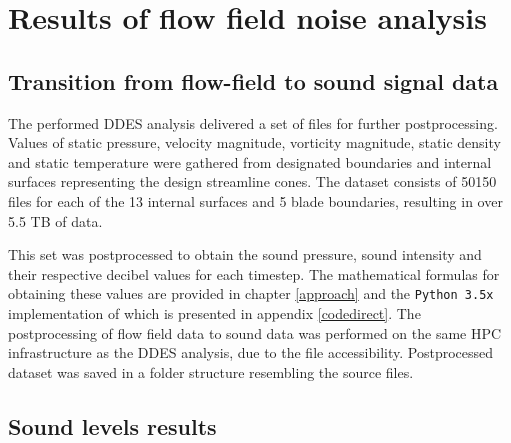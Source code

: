 
\chapter{Results of flow field noise analysis} %

\label{results} %



\section{Transition from flow-field to sound signal data}

The performed DDES analysis delivered a set of files for further postprocessing. Values of static pressure, velocity magnitude, vorticity magnitude, static density and static temperature were gathered from designated boundaries and internal surfaces representing the design streamline cones. The dataset consists of 50150 files for each of the 13 internal surfaces and 5 blade boundaries, resulting in over 5.5 TB of data.

This set was postprocessed to obtain the sound pressure, sound intensity and their respective decibel values for each timestep. The mathematical formulas for obtaining these values are provided in chapter \ref{approach} and the \texttt{Python 3.5x} implementation of which is presented in appendix \ref{codedirect}. The postprocessing of flow field data to sound data was performed on the same HPC infrastructure as the DDES analysis, due to the file accessibility. Postprocessed dataset was saved in a folder structure resembling the source files.

\section{Sound levels results} \label{rms}


